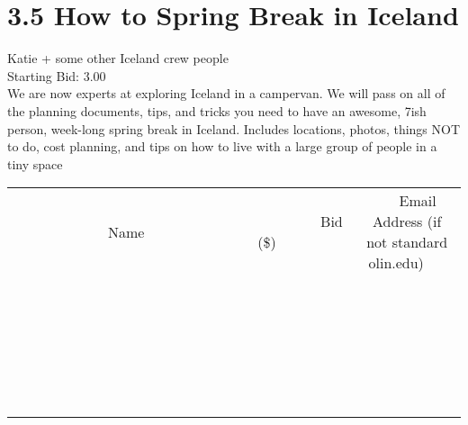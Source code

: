 \documentclass[11pt]{article}
\begin{document}
					\section*{3.5 How to Spring Break in Iceland}
					Katie + some other Iceland crew people \\
					Starting Bid: 3.00 \\
					We are now experts at exploring Iceland in a campervan.  We will pass on all of the planning documents, tips, and tricks you need to have an awesome, 7ish person, week-long spring break in Iceland. Includes locations, photos, things NOT to do, cost planning, and tips on how to live with a large group of people in a tiny space \\
					[6ex]
					\begin{tabular}{c c c}
						~~~~~~~~~~~~~Name~~~~~~~~~~~~~ & ~~~~~~~~~Bid (\$)~~~~~~~~~ & ~~~Email Address (if not standard olin.edu)~~~ \\
				
 & & \\
\hline
 & & \\
\hline
 & & \\
\hline
 & & \\
\hline
 & & \\
\hline
 & & \\
\hline
 & & \\
\hline
 & & \\
\hline
 & & \\
\hline
 & & \\
\hline
 & & \\
\hline
 & & \\
\hline
 & & \\
\hline
 & & \\
\hline
 & & \\
\hline
 & & \\
\hline
 & & \\
\hline
 & & \\
\hline
 & & \\
\hline
 & & \\
\hline
 & & \\
\hline
 & & \\
\hline
 & & \\
\hline
 & & \\
\hline
 & & \\
\hline
 & & \\
\hline
					\end{tabular}
					\clearpage
				
\end{document}
